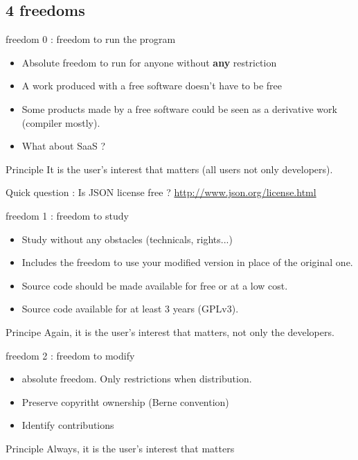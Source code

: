 \documentclass{beamer}
\begin{document}

\subsection{4 freedoms}


\begin{frame}{freedom 0 : freedom to run the program}
  \begin{itemize}
  \item Absolute freedom to run for anyone without \textbf{any} restriction
  \item A work produced with a free software doesn't have to be free
  \item Some products made by a free software could be seen as a derivative work (compiler mostly).
  \item What about SaaS ?
  \end{itemize}

  \begin{alertblock}{Principle}
     It is the user's interest that matters (all users not only developers).
  \end{alertblock}
  
  Quick question : Is JSON license free ? \url{http://www.json.org/license.html}

\end{frame}


\begin{frame}{freedom 1 : freedom to study}
  \begin{itemize}
  \item Study without any obstacles (technicals, rights...)
  \item Includes the freedom to use your modified version in place of the original one.
  \item Source code should be made available for free or at a low cost.
  \item Source code available for at least 3 years (GPLv3).
  \end{itemize}
  \begin{alertblock}{Principe}
    Again, it is the user's interest that matters, not only the developers.
  \end{alertblock}
\end{frame}


\begin{frame}{freedom 2 : freedom to modify}
  \begin{itemize}
  \item absolute freedom. Only restrictions when distribution.
  \item Preserve copyritht ownership (Berne convention)
  \item Identify  contributions
  \end{itemize}
\begin{alertblock}{Principle}
    Always, it is the user's interest that matters
  \end{alertblock}
\end{frame}
\end{document}

